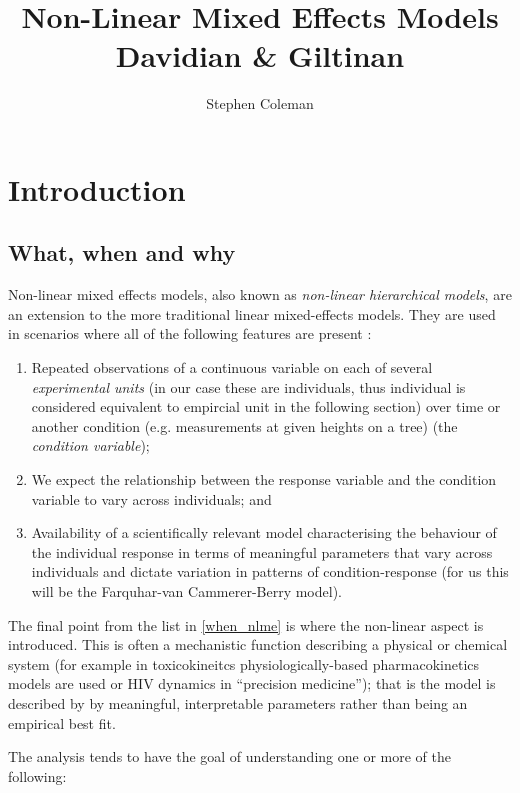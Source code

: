 \documentclass[11pt]{article} %
\title{Non-Linear Mixed Effects Models \\ Davidian \& Giltinan}
\author{Stephen Coleman}
\begin{document}
\maketitle


\section{Introduction}
\subsection{What, when and why}
Non-linear mixed effects models, also known as \emph{non-linear hierarchical models}, are an extension to the more traditional linear mixed-effects models. They are used in scenarios where all of the following features are present \cite{DavidianNonlinearmodelsrepeated2003}:

\begin{enumerate}  \label{when_nlme}
 \item Repeated observations of a continuous variable on each of several \emph{experimental units} (in our case these are individuals, thus individual is considered equivalent to empircial unit in the following section) over time or another condition (e.g. measurements at given heights on a tree) (the \emph{condition variable});
 \item We expect the relationship between the response variable and the condition variable to vary across individuals; and
 \item Availability of a scientifically relevant model characterising the behaviour of the individual response in terms of meaningful parameters that vary across individuals and dictate variation in patterns of condition-response (for us this will be the Farquhar-van Cammerer-Berry model).
\end{enumerate}
The final point from the list in \ref{when_nlme} is where the non-linear aspect is introduced. This is often a mechanistic function describing a physical or chemical system (for example in toxicokineitcs physiologically-based pharmacokinetics models are used or HIV dynamics in ``precision medicine''); that is the model is described by by meaningful, interpretable parameters rather than being an empirical best fit.

The analysis tends to have the goal of understanding one or more of the following:
\end{document}
